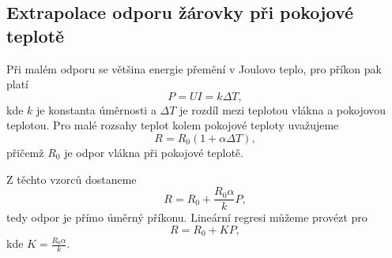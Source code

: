\documentclass[0-protokol.tex]{subfiles}
\begin{document}
\subsection*{Extrapolace odporu žárovky při pokojové teplotě}
Při malém odporu se většina energie přemění v Joulovo teplo, pro příkon pak platí
\begin{equation}
P = U I = k \Delta T,
\end{equation}
kde $k$ je konstanta úměrnosti a $\Delta T$ je rozdíl mezi teplotou vlákna a pokojovou teplotou. Pro malé rozsahy teplot kolem pokojové teploty uvažujeme
\begin{equation}
R = R_0 (1 + \alpha \Delta T),
\end{equation}
přičemž $R_0$ je odpor vlákna při pokojové teplotě. 

Z těchto vzorců dostaneme
\begin{equation}
R = R_0 + \frac{R_0 \alpha}{k}P,
\end{equation}
tedy odpor je přímo úměrný příkonu. Lineární regresi můžeme provézt pro
\begin{equation} \label{eq:regrese}
R = R_0 + K P,
\end{equation}
kde $K = \frac{R_0 \alpha}{k}$.
\end{document}
